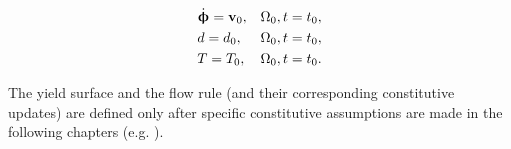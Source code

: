 \begin{mdframed}[
  frametitle={The initial boundary value problem for the time interval $t \in I = [t_0, t_f]$},
  frametitlebackgroundcolor=gray!20,
  backgroundcolor=gray!5,
  linewidth=0pt,
  nobreak=true
  ]
\begin{align*}
                                     & \dot{\boldsymbol{\upphi}} = \textbf{v}_0,                                                  &  & \Omega_0, t = t_0,                                 \\
                                     & d = d_0,                                                            &  & \Omega_0, t = t_0,                                 \\
                                     & T = T_0,                                                            &  & \Omega_0, t = t_0.                                 
  \end{align*}
\end{mdframed}
The yield surface and the flow rule (and their corresponding constitutive updates) are defined only after specific constitutive assumptions are made in the following chapters (e.g. ).

